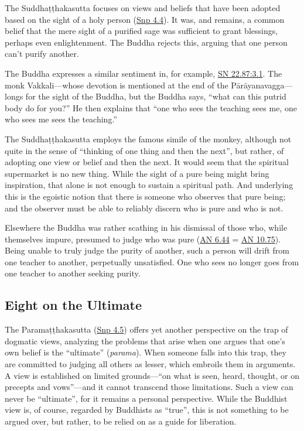 \documentclass[12pt,openany]{book}%
\begin{document}
The \textsanskrit{Suddhaṭṭhakasutta} focuses on views and beliefs that have been adopted based on the sight of a holy person (\href{https://suttacentral.net/snp4.4/en/sujato}{Snp 4.4}). It was, and remains, a common belief that the mere sight of a purified sage was sufficient to grant blessings, perhaps even enlightenment. The Buddha rejects this, arguing that one person can't purify another.

The Buddha expresses a similar sentiment in, for example, \href{https://suttacentral.net/sn22.87/en/sujato\#3.1}{SN 22.87:3.1}. The monk Vakkali—whose devotion is mentioned at the end of the \textsanskrit{Pārāyanavagga}—longs for the sight of the Buddha, but the Buddha says, “what can this putrid body do for you?” He then explains that “one who sees the teaching sees me, one who sees me sees the teaching.”

The \textsanskrit{Suddhaṭṭhakasutta} employs the famous simile of the monkey, although not quite in the sense of “thinking of one thing and then the next”, but rather, of adopting one view or belief and then the next. It would seem that the spiritual supermarket is no new thing. While the sight of a pure being might bring inspiration, that alone is not enough to sustain a spiritual path. And underlying this is the egoistic notion that there is someone who observes that pure being; and the observer must be able to reliably discern who is pure and who is not.

Elsewhere the Buddha was rather scathing in his dismissal of those who, while themselves impure, presumed to judge who was pure (\href{https://suttacentral.net/an6.44/en/sujato}{AN 6.44} = \href{https://suttacentral.net/an10.75/en/sujato}{AN 10.75}). Being unable to truly judge the purity of another, such a person will drift from one teacher to another, perpetually unsatisfied. One who sees no longer goes from one teacher to another seeking purity.

\subsection*{Eight on the Ultimate}

The \textsanskrit{Paramaṭṭhakasutta} (\href{https://suttacentral.net/snp4.5/en/sujato}{Snp 4.5}) offers yet another perspective on the trap of dogmatic views, analyzing the problems that arise when one argues that one’s own belief is the “ultimate” (\textit{parama}). When someone falls into this trap, they are committed to judging all others as lesser, which embroils them in arguments. A view is established on limited grounds—“on what is seen, heard, thought, or on precepts and vows”—and it cannot transcend those limitations. Such a view can never be “ultimate”, for it remains a personal perspective. While the Buddhist view is, of course, regarded by Buddhists as “true”, this is not something to be argued over, but rather, to be relied on as a guide for liberation.
\end{document}
